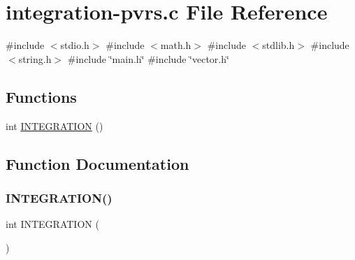 \hypertarget{integration-pvrs_8c}{}\section{integration-\/pvrs.c File Reference}
\label{integration-pvrs_8c}
{\ttfamily \#include $<$stdio.\+h$>$}\newline
{\ttfamily \#include $<$math.\+h$>$}\newline
{\ttfamily \#include $<$stdlib.\+h$>$}\newline
{\ttfamily \#include $<$string.\+h$>$}\newline
{\ttfamily \#include \char`\"{}main.\+h\char`\"{}}\newline
{\ttfamily \#include \char`\"{}vector.\+h\char`\"{}}\newline
\subsection*{Functions}
\begin{DoxyCompactItemize}
\item 
int \hyperlink{integration-pvrs_8c_ac6497adef02df19a58e41c88abf41fda}{I\+N\+T\+E\+G\+R\+A\+T\+I\+ON} ()
\end{DoxyCompactItemize}


\subsection{Function Documentation}
\mbox{\label{integration-pvrs_8c_ac6497adef02df19a58e41c88abf41fda}} 
\subsubsection{\texorpdfstring{I\+N\+T\+E\+G\+R\+A\+T\+I\+O\+N()}{INTEGRATION()}}
{\footnotesize\ttfamily int I\+N\+T\+E\+G\+R\+A\+T\+I\+ON (\begin{DoxyParamCaption}{ }\end{DoxyParamCaption})}

